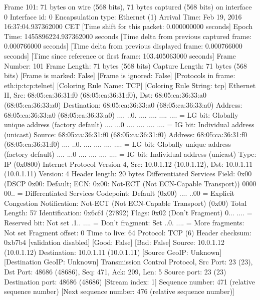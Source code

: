 Frame 101: 71 bytes on wire (568 bits), 71 bytes captured (568 bits) on interface 0
    Interface id: 0
    Encapsulation type: Ethernet (1)
    Arrival Time: Feb 19, 2016 16:37:04.937362000 CET
    [Time shift for this packet: 0.000000000 seconds]
    Epoch Time: 1455896224.937362000 seconds
    [Time delta from previous captured frame: 0.000766000 seconds]
    [Time delta from previous displayed frame: 0.000766000 seconds]
    [Time since reference or first frame: 103.405063000 seconds]
    Frame Number: 101
    Frame Length: 71 bytes (568 bits)
    Capture Length: 71 bytes (568 bits)
    [Frame is marked: False]
    [Frame is ignored: False]
    [Protocols in frame: eth:ip:tcp:telnet]
    [Coloring Rule Name: TCP]
    [Coloring Rule String: tcp]
Ethernet II, Src: 68:05:ca:36:31:f0 (68:05:ca:36:31:f0), Dst: 68:05:ca:36:33:a0 (68:05:ca:36:33:a0)
    Destination: 68:05:ca:36:33:a0 (68:05:ca:36:33:a0)
        Address: 68:05:ca:36:33:a0 (68:05:ca:36:33:a0)
        .... ..0. .... .... .... .... = LG bit: Globally unique address (factory default)
        .... ...0 .... .... .... .... = IG bit: Individual address (unicast)
    Source: 68:05:ca:36:31:f0 (68:05:ca:36:31:f0)
        Address: 68:05:ca:36:31:f0 (68:05:ca:36:31:f0)
        .... ..0. .... .... .... .... = LG bit: Globally unique address (factory default)
        .... ...0 .... .... .... .... = IG bit: Individual address (unicast)
    Type: IP (0x0800)
Internet Protocol Version 4, Src: 10.0.1.12 (10.0.1.12), Dst: 10.0.1.11 (10.0.1.11)
    Version: 4
    Header length: 20 bytes
    Differentiated Services Field: 0x00 (DSCP 0x00: Default; ECN: 0x00: Not-ECT (Not ECN-Capable Transport))
        0000 00.. = Differentiated Services Codepoint: Default (0x00)
        .... ..00 = Explicit Congestion Notification: Not-ECT (Not ECN-Capable Transport) (0x00)
    Total Length: 57
    Identification: 0x6cf4 (27892)
    Flags: 0x02 (Don't Fragment)
        0... .... = Reserved bit: Not set
        .1.. .... = Don't fragment: Set
        ..0. .... = More fragments: Not set
    Fragment offset: 0
    Time to live: 64
    Protocol: TCP (6)
    Header checksum: 0xb7b4 [validation disabled]
        [Good: False]
        [Bad: False]
    Source: 10.0.1.12 (10.0.1.12)
    Destination: 10.0.1.11 (10.0.1.11)
    [Source GeoIP: Unknown]
    [Destination GeoIP: Unknown]
Transmission Control Protocol, Src Port: 23 (23), Dst Port: 48686 (48686), Seq: 471, Ack: 209, Len: 5
    Source port: 23 (23)
    Destination port: 48686 (48686)
    [Stream index: 1]
    Sequence number: 471    (relative sequence number)
    [Next sequence number: 476    (relative sequence number)]
